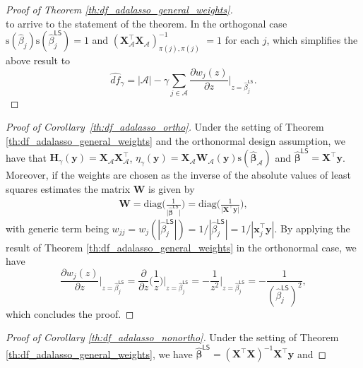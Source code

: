 \documentclass[a4paper, 12pt]{article}
\newcommand{\Aset}{\mathcal{A}}
\newcommand{\sgn}{\mathrm{s}}
\newcommand{\betahat}{\widehat{\boldsymbol\beta}}
\newcommand{\T}{\top}
\def\bbeta{\boldsymbol{\beta}}
\def\bx{\boldsymbol{x}}
\def\by{\boldsymbol{y}}
\def\bH{\mathbf{H}}
\def\bW{\mathbf{W}}
\def\bX{\mathbf{X}}
\def\bx{\mathbf{x}}
\def\by{\mathbf{y}}
\begin{document}
\begin{appendix}
\begin{proof}[Proof of Theorem \ref{th:df_adalasso_general_weights}]
\begin{equation*}
\end{equation*}
to arrive to the statement of the theorem. In the orthogonal case $\sgn(\widehat{\beta}_j) \sgn(\widehat{\beta}_j^\mathsf{LS})=1$ and $(\bX_{\Aset}^{\T} \bX_{\Aset} )^{-1}_{\pi(j),\pi(j)}$ $=1$ for each $j$, which simplifies the above result to
\begin{equation*}
\widehat{df}_\gamma =  |\Aset|-\gamma \sum_{j \in \Aset}  \frac{\partial w_j(z)}{\partial z} \bigg|_{z = \widehat{\beta}_j^\mathsf{LS}} .
\end{equation*}
\end{proof}
%
\begin{proof}[Proof of Corollary~\ref{th:df_adalasso_ortho}]
Under the setting of Theorem \ref{th:df_adalasso_general_weights} and the orthonormal design assumption, we have that $\bH_\gamma(\by) = \bX_{\Aset} \bX_{\Aset}^{\T}$, $\eta_\gamma(\by) = \bX_{\Aset}\bW_{\Aset}(\by)\sgn(\betahat_{\Aset})$ and $\widehat{\bbeta}^{\mathsf{LS}} = \bX^{\T} \by$. Moreover, if the weights are chosen as the inverse of the absolute values of least squares estimates the matrix $\bW$ is given by
\begin{equation*}
\begin{aligned}
\bW=\mathrm{diag}\Big(\frac{1}{\vert\betahat^{\mathsf{LS}}\vert}\Big)=\mathrm{diag}\Big(\frac{1}{\vert\bX^{\T}\by\vert}\Big),
\end{aligned}
\end{equation*}
with generic term being $w_{jj} = w_j(|\widehat{\beta}_j^\mathsf{LS}|) =  1/|\widehat{\beta}^{\mathsf{LS}}_j| =1/|\bx_j^{\T} \by|$. By applying the result of Theorem \ref{th:df_adalasso_general_weights}
in the orthonormal case, we have 
\begin{equation*}
\frac{\partial w_j(z)}{\partial z} \bigg|_{z=\widehat{\beta}_j^\mathsf{LS}} = \frac{\partial}{\partial z} \bigg( \frac{1}{z}\bigg)\bigg|_{z=\widehat{\beta}_j^\mathsf{LS}} =  - \frac{1}{z^2}\bigg|_{z=\widehat{\beta}_j^\mathsf{LS}} =  - \frac{1}{(\widehat{\beta}_j^\mathsf{LS})^2},
\end{equation*}
which concludes the proof.
\end{proof}
%
\begin{proof}[Proof of Corollary \ref{th:df_adalasso_nonortho}]
Under the setting of Theorem \ref{th:df_adalasso_general_weights}, we have $\widehat{\bbeta}^{\mathsf{LS}} = (\bX^{\T}\bX)^{-1}\bX^{\T} \by$ and

\end{proof}
\end{appendix}
\end{document}
